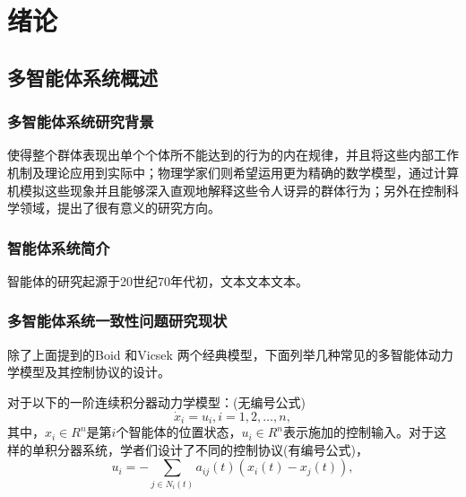 \chapter{绪论}
\normalspacedchars{-}%
\section{多智能体系统概述}
\subsection{多智能体系统研究背景}
使得整个群体表现出单个个体所不能达到的行为的内在规律，并且将这些内部工作机制及理论应用到实际中；物理学家们则希望运用更为精确的数学模型，通过计算机模拟这些现象并且能够深入直观地解释这些令人讶异的群体行为；另外在控制科学领域，\cite{洪奕光2011多智能体系统动态协调与分布式控制设计,olfati2007consensus,savkin2004coordinated}提出了很有意义的研究方向。
\subsection{智能体系统简介}
智能体的研究起源于20世纪70年代初，文本文本文本。
\subsection{多智能体系统一致性问题研究现状}
除了上面提到的Boid 和Vicsek 两个经典模型，下面列举几种常见的多智能体动力学模型及其控制协议的设计。

对于以下的一阶连续积分器动力学模型：(无编号公式)
\[\dot{x}_i=u_i, i=1,2,\ldots,n,
\]
其中，$x_i\in R^n$是第$i$个智能体的位置状态，$u_i\in R^n$表示施加的控制输入。对于这样的单积分器系统，学者们设计了不同的控制协议(有编号公式)，
\begin{equation}
u_i=-\sum_{j\in N_i(t)}a_{ij}(t)(x_i(t)-x_j(t)),
\end{equation}

